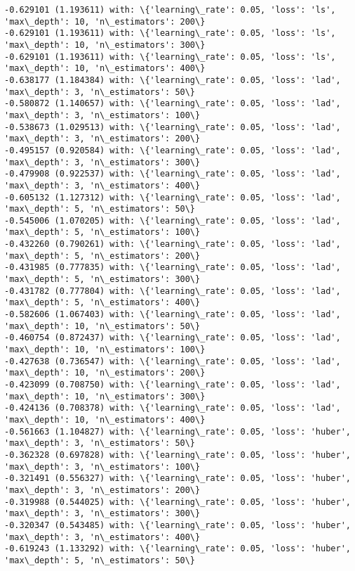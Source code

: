 \documentclass[11pt]{article}
\begin{document}
\begin{Verbatim}[commandchars=\\\{\}]
-0.629101 (1.193611) with: \{'learning\_rate': 0.05, 'loss': 'ls', 'max\_depth': 10, 'n\_estimators': 200\}
-0.629101 (1.193611) with: \{'learning\_rate': 0.05, 'loss': 'ls', 'max\_depth': 10, 'n\_estimators': 300\}
-0.629101 (1.193611) with: \{'learning\_rate': 0.05, 'loss': 'ls', 'max\_depth': 10, 'n\_estimators': 400\}
-0.638177 (1.184384) with: \{'learning\_rate': 0.05, 'loss': 'lad', 'max\_depth': 3, 'n\_estimators': 50\}
-0.580872 (1.140657) with: \{'learning\_rate': 0.05, 'loss': 'lad', 'max\_depth': 3, 'n\_estimators': 100\}
-0.538673 (1.029513) with: \{'learning\_rate': 0.05, 'loss': 'lad', 'max\_depth': 3, 'n\_estimators': 200\}
-0.495157 (0.920584) with: \{'learning\_rate': 0.05, 'loss': 'lad', 'max\_depth': 3, 'n\_estimators': 300\}
-0.479908 (0.922537) with: \{'learning\_rate': 0.05, 'loss': 'lad', 'max\_depth': 3, 'n\_estimators': 400\}
-0.605132 (1.127312) with: \{'learning\_rate': 0.05, 'loss': 'lad', 'max\_depth': 5, 'n\_estimators': 50\}
-0.545006 (1.070205) with: \{'learning\_rate': 0.05, 'loss': 'lad', 'max\_depth': 5, 'n\_estimators': 100\}
-0.432260 (0.790261) with: \{'learning\_rate': 0.05, 'loss': 'lad', 'max\_depth': 5, 'n\_estimators': 200\}
-0.431985 (0.777835) with: \{'learning\_rate': 0.05, 'loss': 'lad', 'max\_depth': 5, 'n\_estimators': 300\}
-0.431782 (0.777804) with: \{'learning\_rate': 0.05, 'loss': 'lad', 'max\_depth': 5, 'n\_estimators': 400\}
-0.582606 (1.067403) with: \{'learning\_rate': 0.05, 'loss': 'lad', 'max\_depth': 10, 'n\_estimators': 50\}
-0.460754 (0.872437) with: \{'learning\_rate': 0.05, 'loss': 'lad', 'max\_depth': 10, 'n\_estimators': 100\}
-0.427638 (0.736547) with: \{'learning\_rate': 0.05, 'loss': 'lad', 'max\_depth': 10, 'n\_estimators': 200\}
-0.423099 (0.708750) with: \{'learning\_rate': 0.05, 'loss': 'lad', 'max\_depth': 10, 'n\_estimators': 300\}
-0.424136 (0.708378) with: \{'learning\_rate': 0.05, 'loss': 'lad', 'max\_depth': 10, 'n\_estimators': 400\}
-0.561663 (1.104827) with: \{'learning\_rate': 0.05, 'loss': 'huber', 'max\_depth': 3, 'n\_estimators': 50\}
-0.362328 (0.697828) with: \{'learning\_rate': 0.05, 'loss': 'huber', 'max\_depth': 3, 'n\_estimators': 100\}
-0.321491 (0.556327) with: \{'learning\_rate': 0.05, 'loss': 'huber', 'max\_depth': 3, 'n\_estimators': 200\}
-0.319988 (0.544025) with: \{'learning\_rate': 0.05, 'loss': 'huber', 'max\_depth': 3, 'n\_estimators': 300\}
-0.320347 (0.543485) with: \{'learning\_rate': 0.05, 'loss': 'huber', 'max\_depth': 3, 'n\_estimators': 400\}
-0.619243 (1.133292) with: \{'learning\_rate': 0.05, 'loss': 'huber', 'max\_depth': 5, 'n\_estimators': 50\}

\end{Verbatim}
\end{document}
